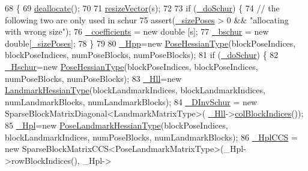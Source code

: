 \begin{DoxyCode}
68 \{
69   \hyperlink{classg2o_1_1BlockSolver_a1877467844b7b9ab51bd6600e3a93eb0}{deallocate}();
70 
71   \hyperlink{classg2o_1_1Solver_ad1f85839e85f3e2c49112fb7e2b843ad}{resizeVector}(s);
72 
73   \textcolor{keywordflow}{if} (\hyperlink{classg2o_1_1BlockSolver_ab375a5fac964182442f38288bd8a103a}{\_doSchur}) \{
74     \textcolor{comment}{// the following two are only used in schur}
75     assert(\hyperlink{classg2o_1_1BlockSolver_a39ec000379885ce09cdd8c23ab6d4567}{\_sizePoses} > 0 && \textcolor{stringliteral}{"allocating with wrong size"});
76     \hyperlink{classg2o_1_1BlockSolver_a416f480d4b27d7f8962ae7ae363f2e32}{\_coefficients} = \textcolor{keyword}{new} \textcolor{keywordtype}{double} [s];
77     \hyperlink{classg2o_1_1BlockSolver_aafddeb1d0a4218fc9c3c77169e20f81a}{\_bschur} = \textcolor{keyword}{new} \textcolor{keywordtype}{double}[\hyperlink{classg2o_1_1BlockSolver_a39ec000379885ce09cdd8c23ab6d4567}{\_sizePoses}];
78   \}
79 
80   \hyperlink{classg2o_1_1BlockSolver_ac222d4342825ed8632a87b4f5be94618}{\_Hpp}=\textcolor{keyword}{new} \hyperlink{classg2o_1_1BlockSolver_a0e7f862860a1e3391cec3cfaf69c48be}{PoseHessianType}(blockPoseIndices, blockPoseIndices, numPoseBlocks, 
      numPoseBlocks);
81   \textcolor{keywordflow}{if} (\hyperlink{classg2o_1_1BlockSolver_ab375a5fac964182442f38288bd8a103a}{\_doSchur}) \{
82     \hyperlink{classg2o_1_1BlockSolver_a46977934a3e4fb0cd36bc4181ed3ec0e}{\_Hschur}=\textcolor{keyword}{new} \hyperlink{classg2o_1_1BlockSolver_a0e7f862860a1e3391cec3cfaf69c48be}{PoseHessianType}(blockPoseIndices, blockPoseIndices, numPoseBlocks, 
      numPoseBlocks);
83     \hyperlink{classg2o_1_1BlockSolver_a88d4c24df24a8fb72be1a4e4cff03d71}{\_Hll}=\textcolor{keyword}{new} \hyperlink{classg2o_1_1BlockSolver_a465b1252905d90fd69b4243716620c45}{LandmarkHessianType}(blockLandmarkIndices, blockLandmarkIndices, 
      numLandmarkBlocks, numLandmarkBlocks);
84     \hyperlink{classg2o_1_1BlockSolver_ad6a1a8f17c8fb854962a8204c79bc981}{\_DInvSchur} = \textcolor{keyword}{new} SparseBlockMatrixDiagonal<LandmarkMatrixType>(
      \hyperlink{classg2o_1_1BlockSolver_a88d4c24df24a8fb72be1a4e4cff03d71}{\_Hll}->\hyperlink{classg2o_1_1SparseBlockMatrix_adfaf13a5f3134205a58c8346a09a672a}{colBlockIndices}());
85     \hyperlink{classg2o_1_1BlockSolver_a0f6051339990e95aa587145a8a6f4f5f}{\_Hpl}=\textcolor{keyword}{new} \hyperlink{classg2o_1_1BlockSolver_aed8b44e394d2f19ca03c87adf90cc97c}{PoseLandmarkHessianType}(blockPoseIndices, blockLandmarkIndices, 
      numPoseBlocks, numLandmarkBlocks);
86     \hyperlink{classg2o_1_1BlockSolver_ab54eb7bb13f8b3a8a5f135a98f2050ec}{\_HplCCS} = \textcolor{keyword}{new} SparseBlockMatrixCCS<PoseLandmarkMatrixType>(\_Hpl->rowBlockIndices(), \_Hpl->

\end{DoxyCode}
